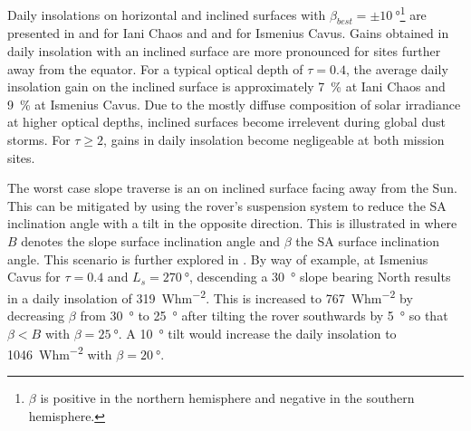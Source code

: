 \vspace{0.5cm}

Daily insolations on horizontal and inclined surfaces with $\beta_{best}=\pm\SI{10}{\degree}$\footnote{$\beta$ is positive in the northern hemisphere and negative in the southern hemisphere.} are presented in  and  for Iani Chaos and  and  for Ismenius Cavus. Gains obtained in daily insolation with an inclined surface are more pronounced for sites further away from the equator. For a typical optical depth of $\tau = 0.4$, the average daily insolation gain on the inclined surface is approximately \SI{7}{\percent} at Iani Chaos and \SI{9}{\percent} at Ismenius Cavus.
Due to the mostly diffuse composition of solar irradiance at higher optical depths, inclined surfaces become irrelevent during global dust storms. For $\tau \geq 2$, gains in daily insolation become negligeable at both mission sites.



\vspace{0.5cm}



\vspace{0.5cm}



\vspace{0.5cm}



The worst case slope traverse is an on inclined surface facing away from the Sun. This can be mitigated by using the rover's suspension system to reduce the \ac{SA} inclination angle with a tilt in the opposite direction. This is illustrated in  where $B$ denotes the slope surface inclination angle and $\beta$ the \ac{SA} surface inclination angle. This scenario is further explored in . By way of example, at Ismenius Cavus for $\tau = 0.4$ and $L_{s}=\SI{270}{\degree}$, descending a \SI{30}{\degree} slope bearing North results in a daily insolation of \SI{319}{Whm^{-2}}. This is increased to \SI{767}{Whm^{-2}} by decreasing $\beta$ from \SI{30}{\degree} to \SI{25}{\degree} after tilting the rover southwards by \SI{5}{\degree} so that $\beta < B$ with $\beta = \SI{25}{\degree}$. A \SI{10}{\degree} tilt would increase the daily insolation to \SI{1046}{Whm^{-2}} with $\beta = \SI{20}{\degree}$.


